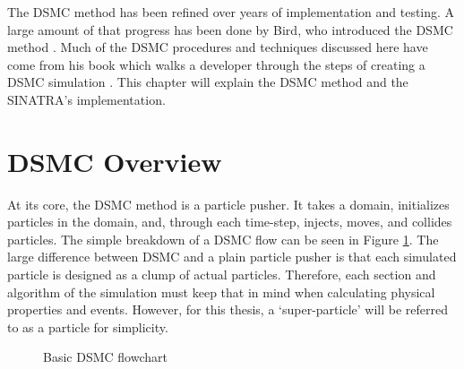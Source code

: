 The DSMC method has been refined over years of implementation and testing. A large amount of that progress has been done by Bird, who introduced the DSMC method \cite{bird_76}. Much of the DSMC procedures and techniques discussed here have come from his book which walks a developer through the steps of creating a DSMC simulation \cite{bird_dsmc}. This chapter will explain the DSMC method and the SINATRA's implementation. \par

\section{DSMC Overview}

\indent At its core, the DSMC method is a particle pusher. It takes a domain, initializes particles in the domain, and, through each time-step, injects, moves, and collides particles. The simple breakdown of a DSMC flow can be seen in Figure \ref{fig:dsmc_flow}. The large difference between DSMC and a plain particle pusher is that each simulated particle is designed as a clump of actual particles. Therefore, each section and algorithm of the simulation must keep that in mind when calculating physical properties and events. However, for this thesis, a `super-particle' will be referred to as a particle for simplicity. \par

\begin{figure}
\centering
    \caption[Basic DSMC flowchart]{Basic DSMC flowchart \cite{Galvez2018a}}
    \label{fig:dsmc_flow}
\end{figure}


